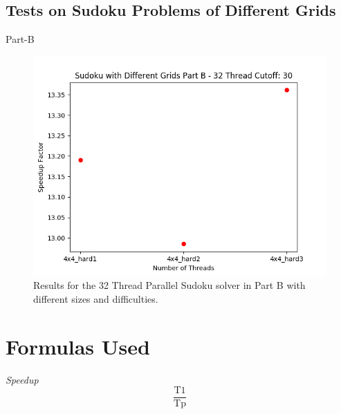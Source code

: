 \documentclass{article}
\begin{document}
\subsection{Tests on Sudoku Problems of Different Grids}
\begin{description}
\item[Part-B]
\end{description} 
\begin{figure}[!htb]
    \centering
    \includegraphics[width=1\linewidth]{./img/grids_part_2_B.png}
    \caption{Results for the 32 Thread Parallel Sudoku solver in Part B with different sizes and difficulties.}
\end{figure}



\section{Formulas Used}

\begin{enumerate}
\begin{item}
\emph{Speedup} 
\begin{equation*}
\frac{\mathrm{T1}}{\mathrm{Tp}}
\end{equation*}
\begin{center}\end{center}
\end{item}
\end{enumerate}
\end{document}
